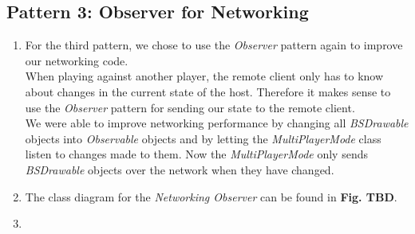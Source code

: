 \documentclass[a4paper,11pt]{article}
\begin{document}
\subsection{Pattern 3:  Observer for Networking}
\begin{enumerate}
\item For the third pattern, we chose to use the \textit{Observer} pattern again to improve our networking code. \\
When playing against another player, the remote client only has to know about changes in the current state of the host.
Therefore it makes sense to use the \textit{Observer} pattern for sending our state to the remote client. \\
We were able to improve networking performance by changing all \textit{BSDrawable} objects into \textit{Observable} objects and by letting the \textit{MultiPlayerMode} class listen to changes made to them.
Now the \textit{MultiPlayerMode} only sends \textit{BSDrawable} objects over the network when they have changed.
\item The class diagram for the \textit{Networking Observer} can be found in \textbf{Fig. TBD}. \\
\begin{minipage}{\linewidth}
\end{minipage}
\item
\end{enumerate}
\end{document}
